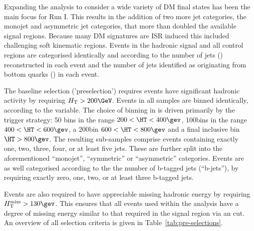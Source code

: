 Expanding the analysis to consider a wide variety of DM final states has been the main focus for Run I. This results in the addition of two more jet categories, the monojet and asymmetric jet categories, that more than doubled the available signal regions. Because many DM signatures are ISR induced this included challenging soft kinematic regions. Events in the hadronic signal and all control regions are categorised identically and according to the number of jets (\njet) reconstructed in each event and the number of jets identified as originating from bottom quarks (\nb) in each event. 

The baseline selection ('preselection') requires events have significant hadronic activity by requiring $\scalht > 200\GeV$.  Events in all samples are binned identically, according to the \HT variable. The choice of binning in \HT is driven primarily by the trigger strategy: 50\gev
bins in the range $200 < \HT < 400\gev$, 100\gev bins in the range $400 < \HT < 600\gev$, a 200\gev bin $600<\HT<800\gev$ and a final 
inclusive bin $\HT > 800\gev$. The resulting sub-samples comprise events containing exactly one, two, three, four, or at least five jets. These are further split into the aforementioned  ``monojet'',  ``symmetric'' or ``asymmetric'' \njet categories. Events are as well categorised according to the the number of b-tagged jets (``b-jets''), by requiring exactly zero, one, two, or at least three b-tagged jets. 


Events are also required to have appreciable missing hadronic energy by requiring $\mht>130\gev$. This ensures that all events used within the analysis have a degree of missing energy similar to that required in the signal region via an \alphat cut. An overview of all selection criteria is given in Table~\ref{tab:pre-selections}.

